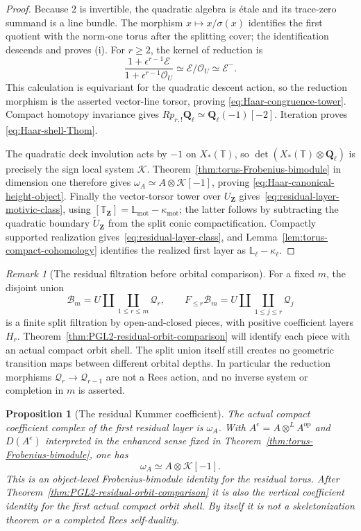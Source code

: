 \documentclass[11pt]{article}
\newtheorem{proposition}[theorem]{Proposition}
\theoremstyle{definition}
\theoremstyle{remark}
\newtheorem{remark}[theorem]{Remark}
\newcommand{\Qell}{\mathbf Q_\ell}
\newcommand{\Lmot}{\mathbb L_{\mathrm{mot}}}
\newcommand{\Lell}{\mathbb L_{\ell}}
\newcommand{\UZ}{U_{\mathbf Z}}
\newcommand{\kappamot}{\kappa_{\mathrm{mot}}}
\newcommand{\kappaell}{\kappa_{\ell}}
\newcommand{\cK}{\mathcal K}
\begin{document}
\begin{proof}
Because $2$ is invertible, the quadratic algebra is \'etale and its
trace-zero summand is a line bundle.  The morphism
$x\mapsto x/\sigma(x)$ identifies the first quotient with the norm-one torus
after the splitting cover; the identification descends and proves (i).
For $r\ge2$, the kernel of reduction is
\[
 \frac{1+\epsilon^{r-1}\mathcal E}
      {1+\epsilon^{r-1}\mathcal O_U}
 \simeq \mathcal E/\mathcal O_U
 \simeq\mathcal E^-.
\]
This calculation is equivariant for the quadratic descent action, so the
reduction morphism is the asserted vector-line torsor, proving
\eqref{eq:Haar-congruence-tower}.  Compact homotopy invariance gives
$Rp_{r,!}\Qell\simeq\Qell(-1)[-2]$.  Iteration proves
\eqref{eq:Haar-shell-Thom}.

The quadratic deck involution acts by $-1$ on $X_*(\mathbb T)$, so
$\det(X_*(\mathbb T)\otimes\Qell)$ is precisely the sign local system $\cK$.
Theorem~\ref{thm:torus-Frobenius-bimodule} in dimension one therefore gives
$\omega_A\simeq A\otimes\cK[-1]$, proving
\eqref{eq:Haar-canonical-height-object}.  Finally the vector-torsor tower
over $\UZ$ gives~\eqref{eq:residual-layer-motivic-class}, using
$[\mathbb T_{\mathbf Z}]=\Lmot-\kappamot$; the latter follows by subtracting
the quadratic boundary $\widetilde\UZ$ from the split conic compactification.
Compactly supported realization gives~\eqref{eq:residual-layer-class}, and
Lemma~\ref{lem:torus-compact-cohomology} identifies the realized first layer
as $\Lell-\kappaell$.
\end{proof}

\begin{remark}[The residual filtration before orbital comparison]
For a fixed $m$, the disjoint union
\[
 \mathscr B_m=U\amalg\coprod_{1\le r\le m}\mathscr Q_r,
 \qquad
 F_{\le r}\mathscr B_m=U\amalg\coprod_{1\le j\le r}\mathscr Q_j
\]
is a finite split filtration by open-and-closed pieces, with positive
coefficient layers $H_r$.  Theorem~\ref{thm:PGL2-residual-orbit-comparison}
will identify each piece with an actual compact orbit shell.  The split union
itself still creates no geometric transition maps between different orbital
depths.  In particular
the reduction morphisms $\mathscr Q_r\to\mathscr Q_{r-1}$ are not a Rees
action, and no inverse system or completion in $m$ is asserted.
\end{remark}

\begin{proposition}[The residual Kummer coefficient]
\label{prop:residual-kummer-bimodule}
The actual compact coefficient complex of the first residual layer is
$\omega_A$.  With $A^e=A\otimes^LA^{\mathrm{op}}$ and $D(A^e)$ interpreted
in the enhanced sense fixed in
Theorem~\ref{thm:torus-Frobenius-bimodule}, one has
\[
 \omega_A\simeq A\otimes\cK[-1].
\]
This is an object-level Frobenius-bimodule identity for the residual torus.
After Theorem~\ref{thm:PGL2-residual-orbit-comparison} it is also the vertical
coefficient identity for the first actual compact orbit shell.  By itself it
is not a skeletonization theorem or a completed Rees self-duality.
\end{proposition}
\end{document}
